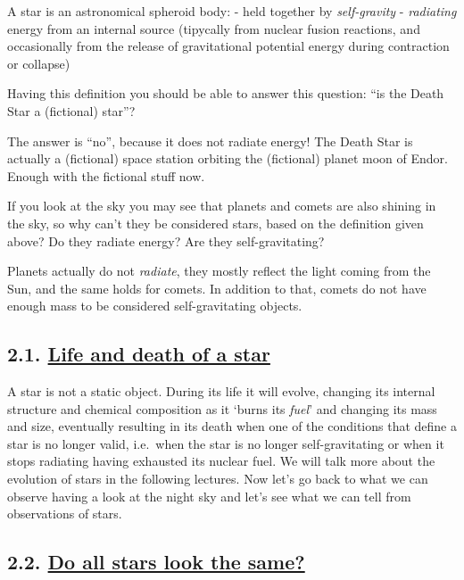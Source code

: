 \documentclass[
  letterpaper,
  DIV=11,
  numbers=noendperiod]{scrartcl}
\begin{document}
A star is an astronomical spheroid body: - held together by
\emph{self-gravity} - \emph{radiating} energy from an internal source
(tipycally from nuclear fusion reactions, and occasionally from the
release of gravitational potential energy during contraction or
collapse)

Having this definition you should be able to answer this question: ``is
the Death Star a (fictional) star''?

The answer is ``no'', because it does not radiate energy! The Death Star
is actually a (fictional) space station orbiting the (fictional) planet
moon of Endor. Enough with the fictional stuff now.

If you look at the sky you may see that planets and comets are also
shining in the sky, so why can't they be considered stars, based on the
definition given above? Do they radiate energy? Are they
self-gravitating?

Planets actually do not \emph{radiate}, they mostly reflect the light
coming from the Sun, and the same holds for comets. In addition to that,
comets do not have enough mass to be considered self-gravitating
objects.

\hypertarget{life-and-death-of-a-star}{%
\subsection{\texorpdfstring{2.1. \protect\hyperlink{toc0_}{Life and
death of a
star}}{2.1. Life and death of a star}}\label{life-and-death-of-a-star}}

A star is not a static object. During its life it will evolve, changing
its internal structure and chemical composition as it `burns its
\emph{fuel}' and changing its mass and size, eventually resulting in its
death when one of the conditions that define a star is no longer valid,
i.e.~when the star is no longer self-gravitating or when it stops
radiating having exhausted its nuclear fuel. We will talk more about the
evolution of stars in the following lectures. Now let's go back to what
we can observe having a look at the night sky and let's see what we can
tell from observations of stars.

\hypertarget{do-all-stars-look-the-same}{%
\subsection{\texorpdfstring{2.2. \protect\hyperlink{toc0_}{Do all stars
look the
same?}}{2.2. Do all stars look the same?}}\label{do-all-stars-look-the-same}}
\end{document}
